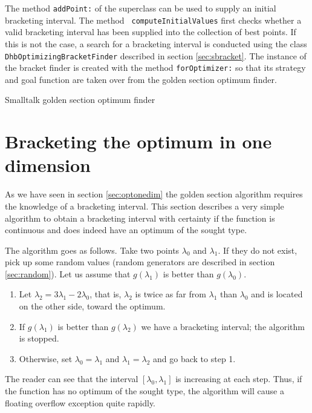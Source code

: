 \documentclass[twoside]{book}
\begin{document}
The method {\tt addPoint:} of the superclass can be used to supply
an initial bracketing interval. The method {\tt
computeInitialValues} first checks whether a valid bracketing
interval has been supplied into the collection of best points. If
this is not the case, a search for a bracketing interval is
conducted using the class {\tt DhbOptimizingBracketFinder}
described in section \ref{sec:sbracket}. The instance of the
bracket finder is created with the method {\tt forOptimizer:} so
that its strategy and goal function are taken over from the golden
section optimum finder.

\begin{listing} Smalltalk golden section optimum finder \label{ls:optimizerOneDim}

\end{listing}

\section{Bracketing the optimum in one dimension}
\label{sec:bracket} As we have seen in section \ref{sec:optonedim}
the golden section algorithm requires the knowledge of a
bracketing interval. This section describes a very simple
algorithm to obtain a bracketing interval with certainty if the
function is continuous and does indeed have an optimum of the
sought type.

The algorithm goes as follows. Take two points $\lambda_0$ and
$\lambda_1$. If they do not exist, pick up some random values
(random generators are described in section \ref{sec:random}). Let
us assume that $g\left(\lambda_1\right)$ is better than
$g\left(\lambda_0\right)$.
\begin{enumerate}
  \item Let $\lambda_2=3\lambda_1-2\lambda_0$, that is, $\lambda_2$ is twice as far from $\lambda_1$ than
$\lambda_0$ and is located on the other side, toward the optimum.
  \item If $g\left(\lambda_1\right)$ is better than
$g\left(\lambda_2\right)$ we have a bracketing interval; the
algorithm is stopped.
  \item Otherwise, set $\lambda_0=\lambda_1$ and $\lambda_1=\lambda_2$ and go back to step 1.
\end{enumerate}
The reader can see that the interval
$\left[\lambda_0,\lambda_1\right]$ is increasing at each step.
Thus, if the function has no optimum of the sought type, the
algorithm will cause a floating overflow exception quite rapidly.
\end{document}
